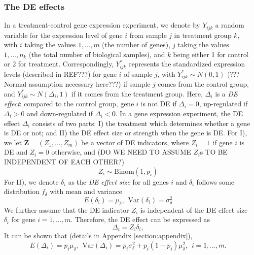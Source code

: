 \documentclass[11pt, a4paper]{article}
\begin{document}
	\subsubsection*{The DE effects}\label{subsection:DEeffect}

	In a treatment-control gene expression experiment, we denote by $Y_{ijk}$ a random variable for the expression level of gene $i$ from sample $j$ in treatment group $k$, with $i$ taking the values $1, \ldots, m$ (the number of genes), $j$ taking the values $1, \ldots, n_k$ (the total number of biological samples), and $k$ being either 1 for control or 2 for treatment. Correspondingly, $Y^{\ast}_{ijk}$ represents the standardized expression levels (described in REF???) for gene $i$ of sample $j$, with $Y^{\ast}_{ijk}\sim N(0, 1)$ (??? Normal assumption necessary here???)  if sample $j$ comes from the control group, and $Y^{\ast}_{ijk}\sim N(\Delta_i, 1)$ if it comes from the treatment group. Here, $\Delta_i$ is a \textit{DE effect}: compared to the control group,  gene $i$ is not DE if $\Delta_i=0$, up-regulated if $\Delta_i >0 $ and down-regulated if $\Delta_i<0$.
	In a gene expression experiment, the DE effect $\Delta_i$ consists of two parts: I) the treatment which determines whether a gene is DE or not; and II) the DE effect size or strength when the gene is DE. 
	For I), we let $\bm Z = (Z_1, \ldots, Z_m)$ be a vector of DE indicators, where $Z_i=1$ if gene $i$ is DE and $Z_i = 0$ otherwise, and (DO WE NEED TO ASSUME $Z_i$s TO BE INDEPENDENT OF EACH OTHER?)
	\begin{equation}\label{eq:DEindicator}
		Z_i \sim \text{Binom}(1, p_i)
	\end{equation}
	For II), we denote $\delta_i$ as the \textit{DE effect size} for all genes $i$ and $\delta_i$ follows some distribution $ f_{\delta}$ with mean and variance
	\begin{equation}\label{eq:DEdistribution}
		E(\delta_i) = \mu_{\delta}, ~~\text{Var}(\delta_i) = \sigma^2_{\delta}
	\end{equation}
	We further assume that the DE indicator $Z_i$ is independent of the DE effect size $\delta_i$ for gene $i=1, \ldots, m$.  Therefore, the DE effect can be expressed as
	\begin{equation}\label{eq:DEeffect}
		\Delta_i = Z_i\delta_i,
	\end{equation}
	It can be shown that (details in Appendix \ref{section:appendix}), 
	\begin{equation}\label{eq:deltaMeanVar}
		E(\Delta_i) = p_i\mu_{\delta}, ~~  \text{Var}(\Delta_i)= p_i\sigma_{\delta}^2 + p_i(1-p_i)\mu_{\delta}^2, ~~i = 1, \ldots, m.
	\end{equation}
	
\end{document}
